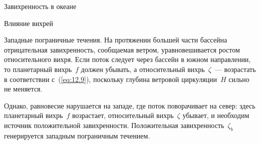 \begin{chapter}{Завихренность в океане}
\begin{section}{Влияние вихрей}
\begin{paragraph}{Западные пограничные течения.}
На протяжении большей части бассейна отрицательная завихренность,
сообщаемая ветром, уравновешивается ростом относительного вихря.
Если поток следует через бассейн в южном направлении, то планетарный 
вихрь~$f$ должен убывать, а относительный вихрь~$\zeta$~--- возрастать 
в соответствии с~(\ref{eq:12.9}), поскольку глубина ветровой циркуляции~$H$ 
сильно не меняется.
%

Однако, равновесие нарушается на западе, где поток поворачивает на
север: здесь планетарный вихрь~$f$ возрастает, относительный вихрь~$\zeta$ 
убывает, и необходим источник положительной завихренности. Положительная
завихренность~$\zeta_{b}$ генерируется западным пограничным течением.
%


\end{paragraph}
\end{section}
\end{chapter}
